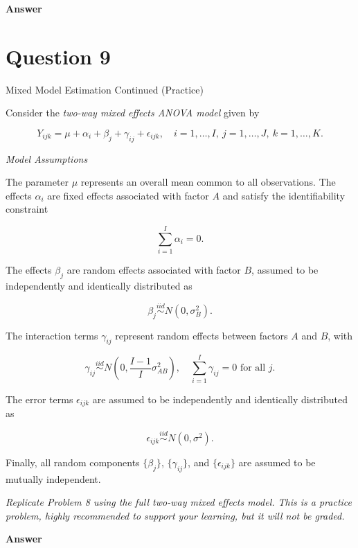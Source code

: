\documentclass[letterpaper]{article}
\begin{document}
		\textbf{Answer}
	
	\clearpage
	
	\section{Question 9}
	{\color{deepred}   Mixed Model Estimation Continued (Practice)}
		
		Consider the \textit{two-way mixed effects ANOVA model} given by
		
		\begin{equation}
			Y_{ijk} = \mu + \alpha_i + \beta_j + \gamma_{ij} + \epsilon_{ijk}, \quad i = 1, \ldots, I, \ j = 1, \ldots, J, \ k = 1, \ldots, K.
		\end{equation}
		
		\textit{Model Assumptions}
		
		The parameter $\mu$ represents an overall mean common to all observations. The effects $\alpha_i$ are fixed effects associated with factor $A$ and satisfy the identifiability constraint
		
		\[
		\sum_{i=1}^{I} \alpha_i = 0.
		\]
		
		The effects $\beta_j$ are random effects associated with factor $B$, assumed to be independently and identically distributed as
		
		\[
		\beta_j \overset{iid}{\sim} N(0, \sigma^2_B).
		\]
		
		The interaction terms $\gamma_{ij}$ represent random effects between factors $A$ and $B$, with
		
		\[
		\gamma_{ij} \overset{iid}{\sim} N\left(0, \frac{I-1}{I}\sigma^2_{AB}\right), \quad \sum_{i=1}^{I} \gamma_{ij} = 0 \text{ for all } j.
		\]
		
		The error terms $\epsilon_{ijk}$ are assumed to be independently and identically distributed as
		
		\[
		\epsilon_{ijk} \overset{iid}{\sim} N(0, \sigma^2).
		\]
		
		Finally, all random components $\{\beta_j\}$, $\{\gamma_{ij}\}$, and $\{\epsilon_{ijk}\}$ are assumed to be mutually independent.
		
		\textit{Replicate Problem 8 using the full two-way mixed effects model. This is a practice problem, highly recommended to support your learning, but it will not be graded.}
		
		
	\textbf{Answer}
	
	\clearpage
	
		
		
		
	
\end{document}

